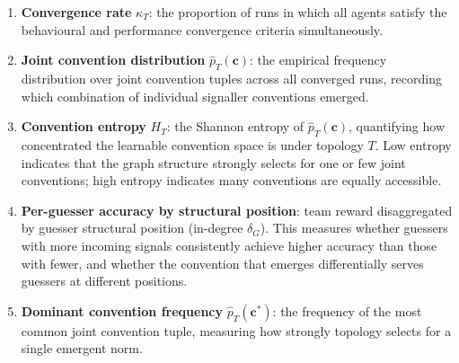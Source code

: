 \documentclass[a4paper,twoside,12pt]{report}
\begin{document}
    \begin{enumerate}
        \item \textbf{Convergence rate} $\kappa_T$: the proportion of runs in
        which all agents satisfy the behavioural and performance convergence
        criteria simultaneously.
    
        \item \textbf{Joint convention distribution} $\hat{p}_T(\mathbf{c})$:
        the empirical frequency distribution over joint convention tuples across
        all converged runs, recording which combination of individual signaller
        conventions emerged.
    
        \item \textbf{Convention entropy} $H_T$: the Shannon entropy of
        $\hat{p}_T(\mathbf{c})$, quantifying how concentrated the learnable
        convention space is under topology $T$. Low entropy indicates that the
        graph structure strongly selects for one or few joint conventions; high
        entropy indicates many conventions are equally accessible.
    
        \item \textbf{Per-guesser accuracy by structural position}: team reward
        disaggregated by guesser structural position (in-degree $\delta_G$).
        This measures whether guessers with more incoming signals consistently
        achieve higher accuracy than those with fewer, and whether the convention
        that emerges differentially serves guessers at different positions.
    
        \item \textbf{Dominant convention frequency} $\hat{p}_T(\mathbf{c}^*)$:
        the frequency of the most common joint convention tuple, measuring how
        strongly topology selects for a single emergent norm.
    \end{enumerate}
    
\end{document}
